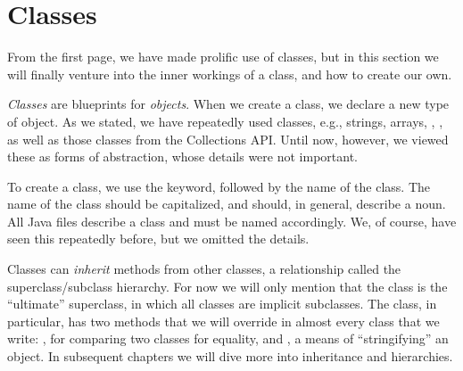 \section{Classes}
From the first page, we have made prolific use of classes, but in this section we will finally venture into the inner workings of a class, and how to create our own.

\textit{Classes} are blueprints for \textit{objects}. When we create a class, we declare a new type of object. As we stated, we have repeatedly used classes, e.g., strings, arrays, , , as well as those classes from the Collections API. Until now, however, we viewed these as forms of abstraction, whose details were not important. 

To create a class, we use the  keyword, followed by the name of the class. The name of the class should be capitalized, and should, in general, describe a noun. All Java files describe a class and must be named accordingly. We, of course, have seen this repeatedly before, but we omitted the details.

Classes can \textit{inherit} methods from other classes, a relationship called the superclass/subclass hierarchy. For now we will only mention that the  class is the ``ultimate'' superclass, in which all classes are implicit subclasses. The  class, in particular, has two methods that we will override in almost every class that we write: , for comparing two classes for equality, and , a means of ``stringifying'' an object. In subsequent chapters we will dive more into inheritance and hierarchies.


